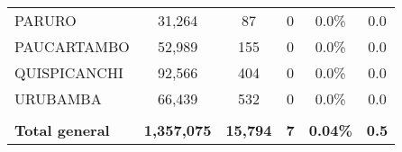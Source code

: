 \begin{tabular}{lccccc}
	\cellcolor[HTML]{C6E0B4}PARURO                                  & 31,264               & 87                         & 0                    & 0.0\%                      & 0.0                                         \\
	\cellcolor[HTML]{C6E0B4}PAUCARTAMBO                             & 52,989               & 155                        & 0                    & 0.0\%                      & 0.0                                         \\
	\cellcolor[HTML]{C6E0B4}QUISPICANCHI                            & 92,566               & 404                        & 0                    & 0.0\%                      & 0.0                                         \\
	\cellcolor[HTML]{C6E0B4}URUBAMBA                                & 66,439               & 532                        & 0                    & 0.0\%                      & 0.0                                         \\
	& \multicolumn{1}{l}{} & \multicolumn{1}{l}{}       & \multicolumn{1}{l}{} & \multicolumn{1}{l}{}       & \multicolumn{1}{l}{}                        \\
	\rowcolor[HTML]{DDEBF7} 
	\textbf{Total general}                                          & \textbf{1,357,075}   & \textbf{15,794}            & \textbf{7}           & \textbf{0.04\%}            & \textbf{0.5}                               
\end{tabular}